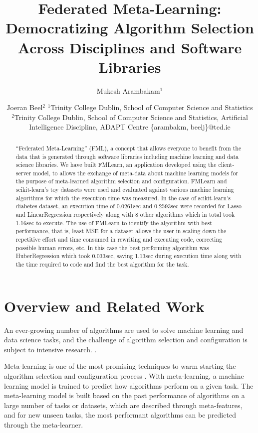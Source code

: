\documentclass{article}
\title{Federated Meta-Learning: Democratizing Algorithm Selection Across Disciplines and Software Libraries}
\author{
Mukesh Arambakam$^1$
\and
Joeran Beel$^2$
\affiliations
$^1$Trinity College Dublin,
School of Computer Science and Statistics\\
$^2$Trinity College Dublin,
School of Computer Science and Statistics,
Artificial Intelligence Discipline,
ADAPT Centre
\emails
\{arambakm, beelj\}@tcd.ie
}
\begin{document}
\maketitle

\begin{abstract}
“Federated Meta-Learning” (FML), a concept that allows everyone to benefit from the data that is generated through software libraries including machine learning and data science libraries. We have built FMLearn, an application developed using the client-server model, to allows the exchange of meta-data about machine learning models for the purpose of meta-learned algorithm selection and configuration.
FMLearn and scikit-learn's toy datasets were used and evaluated against various machine learning algorithms for which the execution time was measured. In the case of scikit-learn’s diabetes dataset, an execution time of 0.0261sec and 0.2593sec were recorded for Lasso and LinearRegression respectively along with 8 other algorithms which in total took 1.16sec to execute. The use of FMLearn to identify the algorithm with best performance, that is, least MSE for a dataset allows the user in scaling down the repetitive effort and time consumed in rewriting and executing code, correcting possible human errors, etc. In this case the best performing algorithm was HuberRegression which took 0.033sec, saving 1.13sec during execution time along with the time required to code and find the best algorithm for the task.
\end{abstract}

\section{Overview and Related Work}
An ever-growing number of algorithms are used to solve machine learning and data science tasks, and the challenge of algorithm selection and configuration is subject to intensive research. \cite{bischl-et-al,brazdil:p,calandra-et-al,collins-et-al2018,cunha-et-al2017,edenhofer-et-al,ferrari-et-al,hutter-et-al,kotthoff:l,lindauer-et-al,romero-et-al,tu:w,vartak-et-al}.

Meta-learning is one of the most promising techniques to warm starting the algorithm selection and configuration process \cite{hutter-et-al}. With meta-learning, a machine learning model is trained to predict how algorithms perform on a given task. The meta-learning model is built based on the past performance of algorithms on a large number of tasks or datasets, which are described through meta-features, and for new unseen tasks, the most performant algorithms can be predicted through the meta-learner.
\end{document}
